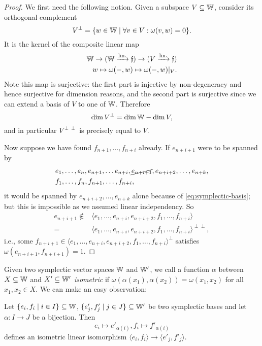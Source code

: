 \begin{proof}
    We first need the following notion.
    Given a subspace $V \subseteq \mathbb{W}$, consider its orthogonal complement
    \[
        V^\perp = \{ w \in \mathbb{W} \mid \forall v \in V : \omega(v, w) = 0 \}.
    \]
    It is the kernel of the composite linear map 
    \begin{align*}
        \mathbb{W} \to (\mathbb{W} \xrightarrow{\text{lin.}} \mathfrak{f}) \to (V \xrightarrow{\text{lin.}} \mathfrak{f}) \\
        w \mapsto \omega(-, w) \mapsto \omega(-, w)|_V.
    \end{align*}
    Note this map is surjective:
    the first part is injective by non-degeneracy and hence surjective for dimension reasons,
    and the second part is surjective since we can extend a basis of $V$ to one of $\mathbb{W}$.
    Therefore 
    \[
        \dim V^\perp = \dim \mathbb{W} - \dim V,
    \]
    and in particular $V^{\perp \perp}$ is precisely equal to $V$.

    Now suppose we have found $f_{n+1}, \ldots, f_{n+i}$ already.
    If $e_{n+i+1}$ were to be spanned by 
    \begin{align*}
        &e_1, \ldots, e_n, e_{n+1}, \ldots e_{n+i}, \cancel{e_{n+i+1}}, e_{n+i+2}, \ldots, e_{n+k},\\ 
        &f_1, \ldots, f_n, f_{n+1}, \ldots, f_{n+i},
    \end{align*}
    it would be spanned by $e_{n+i+2}, \ldots, e_{n+k}$ alone because of \eqref{eq:symplectic-basis};
    but this is impossible as we assumed linear independency.
    So 
    \begin{align*}
        e_{n+i+1} 
        \not\in{} &\langle e_1, \ldots, e_{n+i}, e_{n+i+2}, f_1, \ldots, f_{n+i} \rangle \\
        ={} &\langle e_1, \ldots, e_{n+i}, e_{n+i+2}, f_1, \ldots, f_{n+i} \rangle^{\perp \perp},
    \end{align*}
    i.e., some $f_{n+i+1} \in \langle e_1, \ldots, e_{n+i}, e_{n+i+2}, f_1, \ldots, f_{n+i} \rangle^\perp$ satisfies $\omega(e_{n+i+1}, f_{n+i+1}) = 1$.
\end{proof}

Given two symplectic vector spaces $\mathbb{W}$ and $\mathbb{W}'$,
we call a function $\alpha$ between $X \subseteq \mathbb{W}$ and $X' \subseteq \mathbb{W}'$ \emph{isometric} if 
$\omega(\alpha(x_1), \alpha(x_2)) = \omega(x_1, x_2)$ for all $x_1, x_2 \in X$.
We can make an easy observation:
\begin{lemma}\label{lem:symplectic-basis-gives-isometry}
Let $\{e_i, f_i \mid i \in I\} \subseteq \mathbb{W}$, $\{e'_j, f'_j \mid j \in J\} \subseteq \mathbb{W}'$ be two symplectic bases
and let $\alpha : I \to J$ be a bijection.
Then 
\[
    e_i \mapsto e'_{\alpha(i)}, f_i \mapsto f'_{\alpha(i)}
\]
defines an isometric linear isomorphism $\langle e_i, f_i \rangle \to \langle e'_j, f'_j \rangle$.
\end{lemma}

